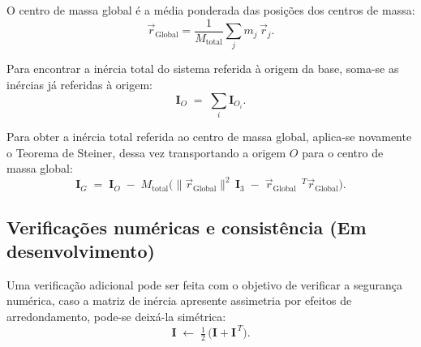 O centro de massa global é a média ponderada das posições dos centros de massa:
\begin{equation}
  \vec{r}_{\text{Global}} = \frac{1}{M_{\text{total}}} \sum_{j} m_j \,\vec{r}_j .
\end{equation}

Para encontrar a inércia total do sistema referida à origem da base, soma-se as inércias já referidas à origem:
\begin{equation}
  \mathbf{I}_{O} \;=\; \sum_{i} \mathbf{I}_{O_i} .
\end{equation}

Para obter a inércia total referida ao centro de massa global, aplica-se novamente o Teorema de Steiner, dessa vez transportando a origem $O$ para o centro de massa global:
\begin{equation}
  \mathbf{I}_{G} \;=\; \mathbf{I}_{O} \;-\;
  M_{\text{total}} \Big( \|\vec{r}_{\text{Global}}\|^2 \,\mathbf{I}_3 \;-\;
  \vec{r}_{\text{Global}} \, \, {}^{\,T} \vec{r}_{\text{Global}} \Big) .
\end{equation}

\subsection{Verificações numéricas e consistência (Em desenvolvimento)}
Uma verificação adicional pode ser feita com o objetivo de verificar a segurança numérica, caso a matriz de inércia apresente assimetria por efeitos de arredondamento, pode-se deixá-la simétrica:
\begin{equation}
  \mathbf{I} \;\leftarrow\; \tfrac{1}{2}\,\big( \mathbf{I} + \mathbf{I}^{\,T} \big).
\end{equation}
